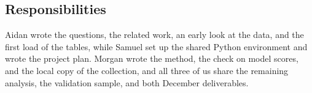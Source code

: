 \subsection{Responsibilities}

Aidan wrote the questions, the related work, an early look at the data, and the first load of the tables, while Samuel set up the shared Python environment and wrote the project plan.
Morgan wrote the method, the check on model scores, and the local copy of the collection, and all three of us share the remaining analysis, the validation sample, and both December deliverables.
